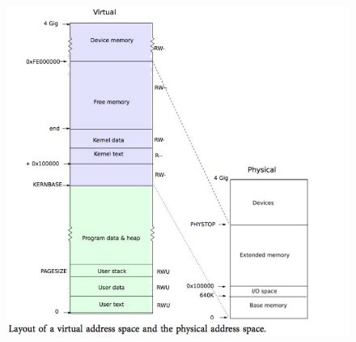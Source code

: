 \documentclass[a4paper,12pt]{report}
\begin{document}
\begin{figure}[H]
	\centering
	\includegraphics [width=1.0\textwidth]{figure//media//image2.png}
\end{figure}
\end{document}
